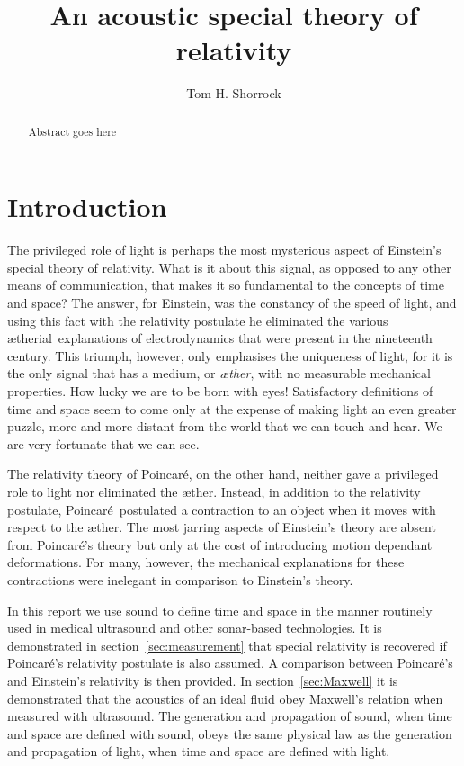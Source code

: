\documentclass[10pt, fleqn,final,showtrims,oldfontcommands]{article} %
\title{An acoustic special theory of relativity}
\author{Tom H. Shorrock}
\newcommand{\aether}{\ae ther}
\newcommand{\aetherial}{\ae therial}
\newcommand{\Poincare}{Poincar{\'e}}
\begin{document}
\maketitle
\begin{abstract}
Abstract goes here
\end{abstract}

\section{Introduction}\label{sec:introduction}

The privileged role of light is perhaps the most mysterious aspect of Einstein's special theory of relativity.
What is it about this signal, as opposed to any other means of communication, that makes it  so fundamental to the  concepts of time and space?
The answer, for Einstein, was the constancy of the speed of light,
and using this fact with the relativity postulate he eliminated the  various \aetherial\ explanations of electrodynamics that were present in the nineteenth century.
This triumph, however, only emphasises the uniqueness of light, for it is the  only  signal that has a  medium, or {\em \aether}, with no measurable mechanical properties.
How lucky we are to be born with eyes! %
Satisfactory definitions of time and space seem to come only at the expense of making light  an even greater puzzle,
more and more distant from the world that we can touch and hear.
We are very fortunate that we can see.

The relativity theory of \Poincare, on the other hand,  neither gave a privileged role to light nor eliminated the \aether.
Instead, in addition to the relativity postulate, \Poincare\ postulated a  contraction to an object  when it moves with respect to the \aether.
The most jarring aspects of Einstein's theory are absent from \Poincare's theory but only at the cost of introducing motion dependant deformations.
For many, however, the mechanical explanations for these contractions were inelegant in comparison to Einstein's theory.

In this report we use sound to define time and space 
in the manner  routinely used in medical ultrasound and other sonar-based technologies.
It is demonstrated in section~\ref{sec:measurement} that special relativity is recovered if \Poincare's relativity postulate is also assumed.
A comparison between \Poincare's and Einstein's relativity is then provided.
In section~\ref{sec:Maxwell} it is demonstrated that the acoustics of an ideal fluid obey Maxwell's relation when measured with ultrasound.
The generation and propagation of sound,  when time and space are defined with  sound,
obeys the same physical law as the generation and propagation of light,  when time and space are defined with light.
\end{document}
